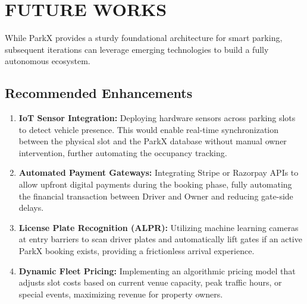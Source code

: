 \chapter{FUTURE WORKS}
While ParkX provides a sturdy foundational architecture for smart parking, subsequent iterations can leverage emerging technologies to build a fully autonomous ecosystem.

\section{Recommended Enhancements}
\begin{enumerate}
    \item \textbf{IoT Sensor Integration:} 
    Deploying hardware sensors across parking slots to detect vehicle presence. This would enable real-time synchronization between the physical slot and the ParkX database without manual owner intervention, further automating the occupancy tracking.
    
    \item \textbf{Automated Payment Gateways:} 
    Integrating Stripe or Razorpay APIs to allow upfront digital payments during the booking phase, fully automating the financial transaction between Driver and Owner and reducing gate-side delays.
    
    \item \textbf{License Plate Recognition (ALPR):} 
    Utilizing machine learning cameras at entry barriers to scan driver plates and automatically lift gates if an active ParkX booking exists, providing a frictionless arrival experience.
    
    \item \textbf{Dynamic Fleet Pricing:} 
    Implementing an algorithmic pricing model that adjusts slot costs based on current venue capacity, peak traffic hours, or special events, maximizing revenue for property owners.
\end{enumerate}
